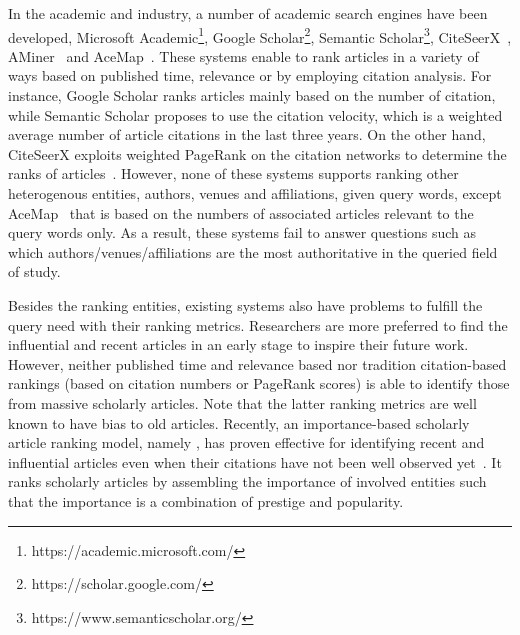 In the academic and industry, a number of academic search engines have been developed, \eg Microsoft Academic\footnote{https://academic.microsoft.com/}, Google Scholar\footnote{https://scholar.google.com/}, Semantic Scholar\footnote{https://www.semanticscholar.org/}, CiteSeerX~\cite{li2006citeseerx}, AMiner~\cite{tang2008arnetminer} and AceMap~\cite{tan2016acemap}.
%
These systems enable to rank articles in a variety of  ways based on published time, relevance or by  employing citation analysis. For instance, Google Scholar ranks articles mainly based on the number of citation, while Semantic Scholar proposes to use the citation velocity, which is a weighted average number of article citations in the last three years. On the other hand, CiteSeerX exploits weighted PageRank on the citation networks to determine the ranks of articles~\cite{sun2007popularity}.
%
However, none of these systems supports ranking other heterogenous entities, \eg authors, venues and affiliations, given query words, except AceMap~\cite{tan2016acemap} that is based on the numbers of associated articles relevant to the query words only. As a result, these systems fail to answer questions such as which authors/venues/affiliations are the most authoritative in the queried field of study.


Besides the ranking entities, existing systems also have problems to fulfill the query need with their ranking metrics.
Researchers are more preferred to find the influential and recent articles in an early stage to inspire their future work.
However, neither published time and relevance based nor tradition citation-based rankings (\eg based on citation numbers or PageRank scores) is able to identify those from massive scholarly articles. Note that the latter ranking metrics are well known to have bias to old articles.
%
Recently, an importance-based scholarly article ranking model, namely \sarank, has proven effective for identifying recent and influential articles even when their citations have not been well observed yet~\cite{ma2018query}. It ranks scholarly articles by assembling the importance of involved entities such that the importance is a combination of prestige and popularity. %






